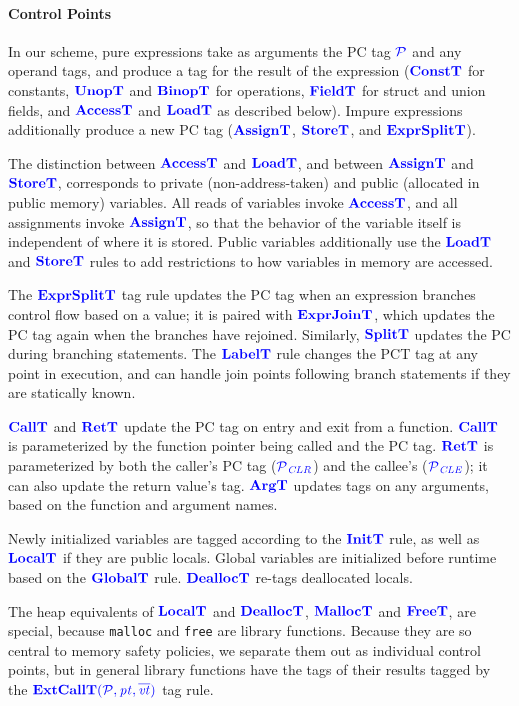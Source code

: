 \documentclass{llncs}
\begin{document}
\paragraph{Control Points}

In our scheme, pure expressions take as arguments the PC tag \(\PCT\) and any operand tags,
and produce a tag for the result of the expression (\(\consttname\) for constants,
\(\unoptname\) and \(\binoptname\) for operations, \(\fieldtname\) for struct and union fields,
and \(\accesstname\) and \(\loadtname\) as described below).
Impure expressions additionally produce a new PC tag (\(\assigntname\), \(\storetname\),
and \(\exprsplittname\)).

The distinction between \(\accesstname\) and \(\loadtname\), and between
\(\assigntname\) and \(\storetname\), corresponds to private (non-address-taken)
and public (allocated in public memory) variables. All reads of variables invoke
\(\accesstname\), and all assignments invoke \(\assigntname\), so that the behavior of the
variable itself is independent of where it is stored. Public variables
additionally use the \(\loadtname\) and \(\storetname\) rules to add restrictions to how
variables in memory are accessed.

The \(\exprsplittname\) tag rule updates the PC tag when an expression branches control
flow based on a value; it is paired with \(\exprjointname\), which updates the PC tag again
when the branches have rejoined. Similarly, \(\splittname\) updates the PC during
branching statements. The \(\labeltname\) rule changes the PCT tag at any point in execution,
and can handle join points following branch statements if they are statically known.

\(\calltname\) and \(\rettname\) update the PC tag on entry and exit from a function.
\(\calltname\) is parameterized by the function pointer being called and the PC tag.
\(\rettname\) is parameterized by both the caller's PC tag (\(\PCT[_{\color{blue} CLR}]\))
and the callee's (\(\PCT[_{\color{blue} CLE}]\)); it can also update the return value's tag.
\(\argtname\) updates tags on any arguments, based on the function and argument names.

Newly initialized variables are tagged according to the \(\inittname\) rule, as
well as \(\localtname\) if they are public locals. Global variables are initialized
before runtime based on the \(\globaltname\) rule. \(\dealloctname\) re-tags deallocated
locals.

The heap equivalents of \(\localtname\) and \(\dealloctname\), \(\malloctname\) and
\(\freetname\), are special, because {\tt malloc} and {\tt free} are library functions.
Because they are so central to memory safety policies, we separate them out as individual
control points, but in general library functions have the tags of their results tagged
by the \(\extcallt\) tag rule.
\end{document}
